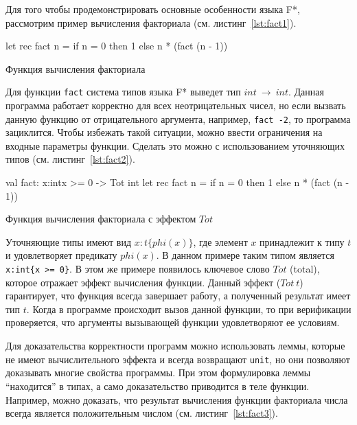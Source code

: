 \documentclass[12pt]{matmex-diploma}
\begin{document}
Для того чтобы продемонстрировать основные особенности языка F*, рассмотрим пример вычисления факториала (см. листинг~\ref{lst:fact1}). 

\begin{listing}
\begin{pyglist}[language=ocaml,numbers=none,numbersep=5pt, fontsize=\small]
let rec fact n =
    if n = 0 then 1 else n * (fact (n - 1))  
\end{pyglist}
\caption{Функция вычисления факториала}
\label{lst:fact1}  
\end{listing}

Для функции \verb|fact| система типов языка F* выведет тип $int ~\to~ int$. Данная программа работает корректно для всех неотрицательных чисел, но если вызвать данную функцию от отрицательного аргумента, например, \verb|fact -2|, то программа зациклится. Чтобы избежать такой ситуации, можно ввести ограничения на входные параметры функции. Сделать это можно с использованием уточняющих типов (см. листинг~\ref{lst:fact2}).

\begin{listing} 
\begin{pyglist}[language=ocaml,numbers=none,numbersep=5pt, fontsize=\small]
val fact: x:int{x >= 0} -> Tot int
let rec fact n =
    if n = 0 then 1 else n * (fact (n - 1))  
\end{pyglist}
\caption{Функция вычисления факториала с эффектом $Tot$}
\label{lst:fact2}   
\end{listing}

Уточняющие типы имеют вид $x:t\{phi(x)\}$, где элемент $x$ принадлежит к типу $t$ и удовлетворяет предикату $phi(x)$. В данном примере таким типом является \verb|x:int{x >= 0}|. В этом же примере появилось ключевое слово $Tot$ (total), которое отражает эффект вычисления функции. Данный эффект ($Tot~t$) гарантирует, что функция всегда завершает работу, а полученный результат имеет тип $t$. Когда в программе происходит вызов данной функции, то при верификации проверяется, что аргументы вызывающей функции удовлетворяют ее условиям.

Для доказательства корректности программ можно использовать леммы, которые не имеют вычислительного эффекта и всегда возвращают \verb|unit|, но они позволяют доказывать многие свойства программы. При этом формулировка леммы ``находится'' в типах, а само доказательство приводится в теле функции. Например, можно доказать, что результат вычисления функции факториала числа всегда является положительным числом (см. листинг~\ref{lst:fact3}).
\end{document}
